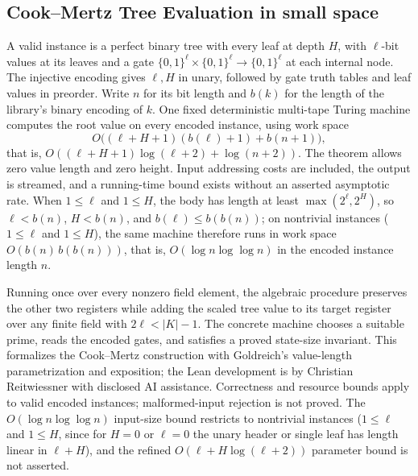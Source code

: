 \begin{result}
\subsection{Cook--Mertz Tree Evaluation in small space}
A valid instance is a perfect binary tree with every leaf at depth $H$, with $\ell$-bit values at
its leaves and a gate
$\{0,1\}^{\ell}\times\{0,1\}^{\ell}\to\{0,1\}^{\ell}$ at each internal node.
The injective encoding gives $\ell,H$ in unary, followed by gate truth tables
and leaf values in preorder. Write $n$ for its bit length and $b(k)$ for the
length of the library's binary encoding of $k$.
One fixed deterministic multi-tape Turing machine computes the root value on
every encoded instance, using work space
\[
O\bigl((\ell+H+1)(b(\ell)+1)+b(n+1)\bigr),
\]
that is, $O((\ell+H+1)\log(\ell+2)+\log(n+2))$.
The theorem allows zero value length and zero height. Input addressing costs
are included, the output is streamed, and a running-time bound exists without
an asserted asymptotic rate. When $1\le\ell$ and $1\le H$, the body has length at
least $\max(2^\ell,2^H)$, so $\ell<b(n)$, $H<b(n)$, and $b(\ell)\le b(b(n))$; on
nontrivial instances ($1\le\ell$ and $1\le H$), the same machine therefore runs in
work space $O(b(n)\,b(b(n)))$, that is, $O(\log n\log\log n)$ in the encoded
instance length $n$.

Running once over every nonzero field element, the algebraic procedure preserves
the other two registers while adding the
scaled tree value to its target register over any finite field with
$2\ell<|K|-1$. The concrete machine chooses a suitable prime, reads the encoded
gates, and satisfies a proved state-size invariant. This formalizes the
Cook--Mertz construction with Goldreich's value-length parametrization and
exposition; the Lean development is by Christian Reitwiessner with disclosed
AI assistance.\citep{CookMertz2024,Goldreich2024TreeEval}
Correctness and resource bounds apply to valid encoded instances; malformed-input
rejection is not proved. The $O(\log n\log\log n)$ input-size bound restricts to
nontrivial instances ($1\le\ell$ and $1\le H$, since for $H=0$ or $\ell=0$ the
unary header or single leaf has length linear in $\ell+H$), and the refined
$O(\ell+H\log(\ell+2))$ parameter bound is not asserted.


\end{result}
